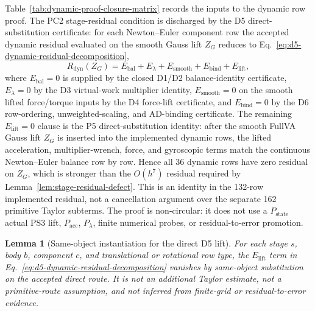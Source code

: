 \documentclass[preprint,12pt]{elsarticle}
\newtheorem{lemma}{Lemma}
\begin{document}
Table~\ref{tab:dynamic-proof-closure-matrix} records the inputs to the dynamic
row proof.  The PC2 stage-residual condition is discharged by the D5
direct-substitution certificate:
for each Newton--Euler component row the accepted dynamic residual evaluated
on the smooth Gauss lift \(Z_G\) reduces to Eq.~\eqref{eq:d5-dynamic-residual-decomposition},
\begin{equation}
\label{eq:d5-dynamic-residual-decomposition}
R_{\mathrm{dyn}}(Z_G)
=E_{\mathrm{bal}}+E_{\lambda}+E_{\mathrm{smooth}}
 +E_{\mathrm{bind}}+E_{\mathrm{lift}},
\end{equation}
where $E_{\mathrm{bal}}=0$ is supplied by the closed D1/D2
balance-identity certificate, $E_{\lambda}=0$ by the D3 virtual-work multiplier
identity, $E_{\mathrm{smooth}}=0$ on the smooth lifted force/torque inputs by
the D4 force-lift certificate, and $E_{\mathrm{bind}}=0$ by the D6 row-ordering,
unweighted-scaling, and AD-binding certificate.  The remaining
\(E_{\mathrm{lift}}=0\) clause is the P5 direct-substitution identity: after
the smooth FullVA Gauss lift \(Z_G\) is inserted into the implemented dynamic
rows, the lifted acceleration, multiplier-wrench, force, and gyroscopic terms
match the continuous Newton--Euler balance row by row.  Hence all 36 dynamic
rows have zero residual on \(Z_G\), which is stronger than the \(O(h^7)\)
residual required by Lemma~\ref{lem:stage-residual-defect}.  This is an
identity in the 132-row implemented residual, not a cancellation argument over
the separate 162 primitive Taylor subterms.  The proof is non-circular: it
does not use a \(P_{\mathrm{state}}\) actual PS3 lift, \(P_{\mathrm{acc}}\),
\(P_{\lambda}\), finite numerical probes, or residual-to-error promotion.

\begin{lemma}[Same-object instantiation for the direct D5 lift]
\label{lem:d5-same-object-lift-instantiation}
For each stage \(s\), body \(b\), component \(c\), and translational or
rotational row type, the \(E_{\mathrm{lift}}\) term in
Eq.~\eqref{eq:d5-dynamic-residual-decomposition} vanishes by same-object
substitution on the accepted direct route.  It is not an additional Taylor
estimate, not a primitive-route assumption, and not inferred from finite-grid
or residual-to-error evidence.
\end{lemma}
\end{document}

